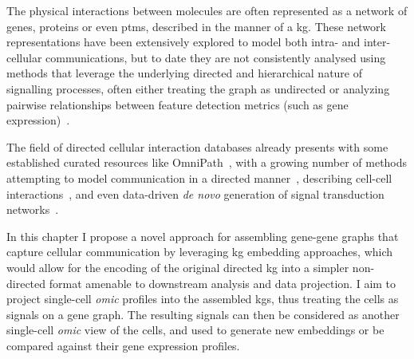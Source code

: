 The physical interactions between molecules are often represented as a network of genes, proteins or even \acrshort{ptm}s, described in the manner of a \acrfull{kg}. These network representations have been extensively explored to model both intra- and inter-cellular communications, but to date they are not consistently analysed using methods that leverage the underlying directed and hierarchical nature of signalling processes, often either treating the graph as undirected or analyzing pairwise relationships between feature detection metrics (such as gene expression)~\cite{pratapa_benchmarking_2020, armingol_deciphering_2020}. 

The field of directed cellular interaction databases already presents with some established curated resources like OmniPath~\cite{turei_integrated_2021}, with a growing number of methods attempting to model communication in a directed manner~\cite{lefebvre_large-scale_2021}, describing cell-cell interactions~\cite{fischer_modeling_2022,yang_sctenifoldxct_2023}, and even data-driven \emph{de novo} generation of signal transduction networks~\cite{hu_cytotalk_2021}.

In this chapter I propose a novel approach for assembling gene-gene graphs that capture cellular communication by leveraging \acrshort{kg} embedding approaches, which would allow for the encoding of the original directed \acrshort{kg} into a simpler non-directed format amenable to downstream analysis and data projection. I aim to project single-cell \emph{omic} profiles into the assembled \acrshort{kg}s, thus treating the cells as signals on a gene graph. The resulting signals can then be considered as another single-cell \emph{omic} view of the cells, and used to generate new embeddings or be compared against their gene expression profiles.

